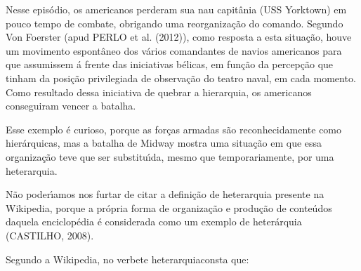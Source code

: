 \documentclass[
12pt,		%
openright,	%
twoside,  %
a4paper,			%
chapter=TITLE,		%
english,			%
french,				%
spanish,			%
brazil				%
]{USPSC-classe/USPSC}
\begin{document}
Nesse epis\'odio, os americanos perderam sua nau capit\^ania (USS Yorktown) em pouco tempo de combate, obrigando uma reorganiza\c{c}\~ao do comando. Segundo Von Foerster (apud  PERLO et al. (2012)), como resposta a esta situa\c{c}\~ao, houve um movimento espont\^aneo dos v\'arios comandantes de navios americanos para que assumissem \'a frente das iniciativas b\'elicas, em fun\c{c}\~ao da percep\c{c}\~ao que tinham da posi\c{c}\~ao privilegiada de observa\c{c}\~ao do teatro naval, em cada momento. Como resultado dessa iniciativa de \textquotedbl quebrar a hierarquia\textquotedbl , os americanos conseguiram vencer a batalha.

















Esse exemplo \'e curioso, porque as for\c{c}as armadas s\~ao reconhecidamente como hier\'arquicas, mas a batalha de Midway mostra uma situa\c{c}\~ao em que essa organiza\c{c}\~ao teve que ser substitu\'{\i}da, mesmo que temporariamente, por uma heterarquia.

















N\~ao poder\'{\i}amos nos furtar de citar a defini\c{c}\~ao de heterarquia presente na Wikipedia, porque a pr\'opria forma de organiza\c{c}\~ao e produ\c{c}\~ao de conte\'udos daquela enciclop\'edia \'e considerada como um exemplo de heter\'arquia  (CASTILHO, 2008).

















Segundo a Wikipedia, no verbete \textquotedbl heterarquia\textquotedbl  consta que:
\end{document}
